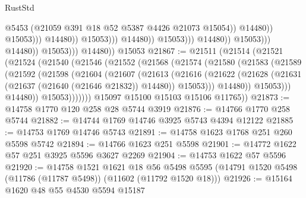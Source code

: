 \begin{lexlean}{RustStd}
\begin{coremodule}
                                                            @5453
                                                            (@21059
                                                              @391
                                                              @18
                                                              @52
                                                              @5387
                                                              @4426
                                                              @21073
                                                              @15054))
                                                          @14480))
                                                      @15053)))
                                                @14480))
                                            @15053)))
                                      @14480))
                                  @15053)))
                            @14480))
                        @15053)))
                  @14480))
              @15053)))
        @14480))
    @15053
@21867 := @21511
    (@21514
      (@21521
        (@21524
          (@21540
            (@21546
              (@21552
                (@21568
                  (@21574
                    (@21580
                      (@21583
                        (@21589
                          (@21592
                            (@21598
                              (@21604
                                (@21607
                                  (@21613
                                    (@21616
                                      (@21622
                                        (@21628
                                          (@21631 (@21637 (@21640 (@21646 @21832)) @14480))
                                          @15053)))
                                    @14480))
                                @15053)))
                          @14480))
                      @15053)))))))
        @15097
        @15100
        @15103
        @15106
        @11765))
@21873 := @14758 @1770 @120 @258 @28 @5744 @3919
@21876 := @14766 @1770 @258 @5744
@21882 := @14744 @1769 @14746 @3925 @5743 @4394 @12122
@21885 := @14753 @1769 @14746 @5743
@21891 := @14758 @1623 @1768 @251 @260 @5598 @5742
@21894 := @14766 @1623 @251 @5598
@21901 := @14772 @1622 @57 @251 @3925 @5596 @3627 @2269
@21904 := @14753 @1622 @57 @5596
@21920 := @14758
    @1521
    @1621
    @18
    @56
    @5498
    @5595
    (@14791 @1520 @5498 (@11786 (@11787 @5498)) (@11602 (@11792 @1520 @18)))
@21926 := @15164 @1620 @48 @55 @4530 @5594 @15187

\end{coremodule}
\end{lexlean}
